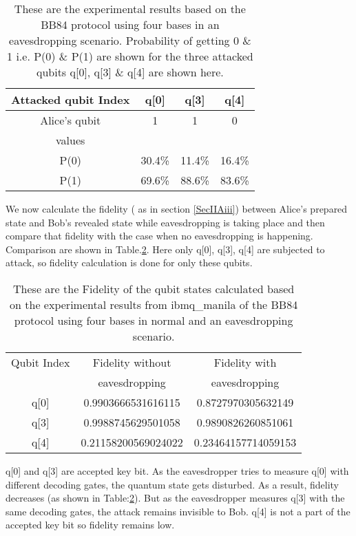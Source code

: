 \documentclass[superscriptaddress,twocolumn,showpacs,prb,floatfix]{revtex4}
\begin{document}
\begin{table}[ht]
    \centering
    \begin{tabular}{|c|c|c|c|}
    \hline
    \hline
    Attacked qubit Index & q[0] & q[3] & q[4] \\[0.5ex]
    \hline
    Alice's qubit & 1 & 1 & 0  \\  values & & &  \\[0.5ex]
    \hline
    P(0) & 30.4\% & 11.4\% & 16.4\% \\[0.5ex]
    \hline
    P(1) & 69.6\% & 88.6\% & 83.6\% \\[0.5ex]
    \hline
    \end{tabular}
    \caption{These are the experimental results based on the BB84 protocol using four bases in an eavesdropping scenario. Probability of getting 0 \& 1 i.e. P(0) \& P(1) are shown for the three attacked qubits q[0], q[3] \& q[4] are shown here. }
    \label{qkdtable6}
\end{table}

We now calculate the fidelity ( as in section \ref{SecIIAiii}) between Alice's prepared state and Bob's revealed state while eavesdropping is taking place and then compare that fidelity with the case when no eavesdropping is happening. Comparison are shown in Table.\ref{Fid_table_attack}. Here only q[0], q[3], q[4] are subjected to attack, so fidelity calculation is done for only these qubits. 

\begin{table}[ht]
    \centering
    \begin{tabular}{|c|c|c|}
    \hline
    \hline
    Qubit Index & Fidelity without & Fidelity with \\ & eavesdropping & eavesdropping \\ [0.5ex]
    \hline
     q[0] & 0.9903666531616115  & 0.8727970305632149 \\ [0.5ex]
    \hline
     q[3] & 0.9988745629501058  & 0.9890826260851061 \\ [0.5ex]
    \hline
    q[4] & 0.21158200569024022 & 0.23464157714059153 \\[0.5ex]
    \hline
    \end{tabular}
    \caption{These are the Fidelity of the qubit states calculated based on the experimental results from ibmq\_manila of the BB84 protocol using four bases in normal and an eavesdropping scenario.}
    \label{Fid_table_attack}
\end{table}
q[0] and q[3] are accepted key bit. As the eavesdropper tries to measure q[0] with different decoding gates, the quantum state gets disturbed. As a result, fidelity decreases (as shown in Table:\ref{Fid_table_attack}). But as the eavesdropper measures q[3] with the same decoding gates, the attack remains invisible to Bob. q[4] is not a part of the accepted key bit so fidelity remains low.  
\end{document}
